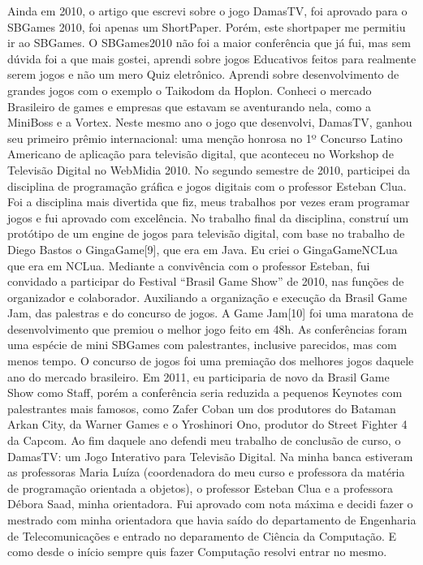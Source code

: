 \documentclass[10pt,a4paper,oneside]{book}
\begin{document}
Ainda em 2010, o artigo que escrevi sobre o jogo DamasTV, foi aprovado para o SBGames 2010, foi apenas um ShortPaper. Porém, este shortpaper me permitiu ir ao SBGames. O SBGames2010 não foi a maior conferência que já fui, mas sem dúvida foi a que mais gostei, aprendi sobre jogos Educativos feitos para realmente serem jogos e não um mero Quiz eletrônico. Aprendi sobre desenvolvimento de grandes jogos com o exemplo o Taikodom da Hoplon. Conheci o mercado Brasileiro de games e empresas que estavam se aventurando nela, como a MiniBoss e a Vortex.
Neste mesmo ano o jogo que desenvolvi, DamasTV, ganhou seu primeiro prêmio internacional: uma menção honrosa no 1º Concurso Latino Americano de aplicação para televisão digital, que aconteceu no Workshop de Televisão Digital no WebMidia 2010.
No segundo semestre de 2010, participei da disciplina de programação gráfica e jogos digitais com o professor Esteban Clua. Foi a disciplina mais divertida que fiz, meus trabalhos por vezes eram programar jogos e fui aprovado com excelência. No trabalho final da disciplina, construí um protótipo de um engine de jogos para televisão digital, com base no trabalho de Diego Bastos o GingaGame[9], que era em Java. Eu criei o GingaGameNCLua que era em NCLua.
Mediante a convivência com o professor Esteban, fui convidado a participar do Festival “Brasil Game Show” de 2010, nas funções de organizador e colaborador. Auxiliando a organização e execução da Brasil Game Jam, das palestras e do concurso de jogos. A Game Jam[10] foi uma maratona de desenvolvimento que premiou o melhor jogo feito em 48h. As conferências foram uma espécie de mini SBGames com palestrantes, inclusive parecidos, mas com menos tempo. O concurso de jogos foi uma premiação dos melhores jogos daquele ano do mercado brasileiro.
Em 2011, eu participaria de novo da Brasil Game Show como Staff, porém a conferência seria reduzida a pequenos Keynotes com palestrantes mais famosos, como  Zafer Coban um dos produtores do Bataman Arkan City, da Warner Games e o Yroshinori Ono, produtor do Street Fighter 4 da Capcom.
Ao fim daquele ano defendi meu trabalho de conclusão de curso, o DamasTV: um Jogo Interativo para Televisão Digital. Na minha banca estiveram as professoras Maria Luíza (coordenadora do meu curso e professora da matéria de programação orientada a objetos), o professor Esteban Clua e a professora Débora Saad, minha orientadora. Fui aprovado com nota máxima e decidi fazer o mestrado com minha orientadora que havia saído do departamento de Engenharia de Telecomunicações e entrado no deparamento de Ciência da Computação. E como desde o início sempre quis fazer Computação resolvi entrar no mesmo.
\end{document}
